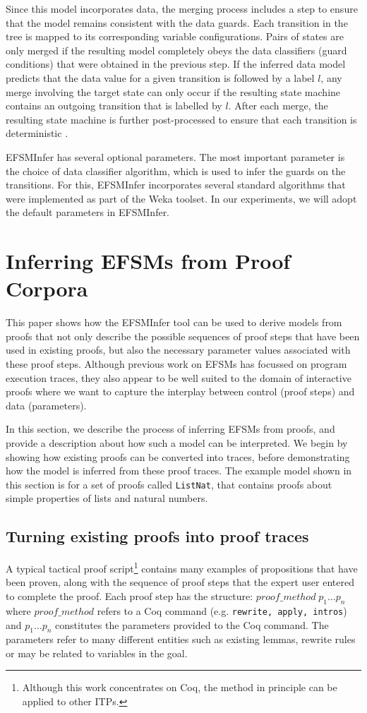 \documentclass{llncs}
\begin{document}
Since this model incorporates data, the merging process includes a step to ensure that the model remains consistent with the data guards. Each transition in the tree is mapped to its corresponding variable configurations. Pairs of states are only merged if the resulting model completely obeys the data classifiers (guard conditions) that were obtained in the previous step. If the inferred data model predicts that the data value for a given transition is followed by a label $l$, any merge involving the target state can only occur if the resulting state machine contains an outgoing transition that is labelled by $l$. After each merge, the resulting state machine is further post-processed to ensure that each transition is deterministic \cite{Walkinshaw13}. 

EFSMInfer has several optional parameters. The most important parameter is the choice of data classifier algorithm, which is used to infer the guards on the transitions. For this, EFSMInfer incorporates several standard algorithms that were implemented as part of the Weka \cite{Weka09} toolset. In our experiments, we will adopt the default parameters in EFSMInfer.

\section{Inferring EFSMs from Proof Corpora}
\label{sec:efsm}
This paper shows how the EFSMInfer tool can be used to derive models from proofs that not only describe the possible sequences of proof steps that have been used in existing proofs, but also the necessary parameter values associated with these proof steps. Although previous work on EFSMs has focussed on program execution traces, they also appear to be well suited to the domain of interactive proofs where we want to capture the interplay between control (proof steps) and data (parameters).

In this section, we describe the process of inferring EFSMs from proofs, and provide a description about how such a model can be interpreted. We begin by showing how existing proofs can be converted into traces, before demonstrating how the model is inferred from these proof traces. The example model shown in this section is for a set of proofs called \texttt{ListNat}, that contains proofs about simple properties of lists and natural numbers.

\subsection{Turning existing proofs into proof traces}
A typical tactical proof script\footnote{Although this work concentrates on Coq, the method in principle can be applied to other ITPs.} contains many examples of propositions that have been proven, along with the sequence of proof steps that the expert user entered to complete the proof. Each proof step has the structure: $proof\_method\;p_{1}\ldots p_{n}$ where $proof\_method$ refers to a Coq command (e.g. \texttt{rewrite, apply, intros}) and $p_{1}\ldots p_{n}$ constitutes the parameters provided to the Coq command. The parameters refer to many different entities such as existing lemmas, rewrite rules or may be related to variables in the goal. 
\end{document}
